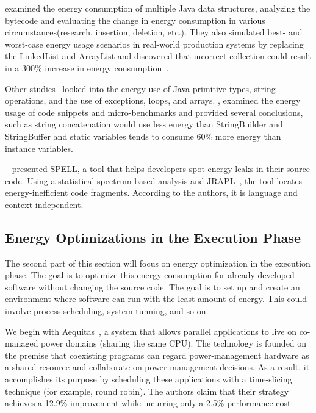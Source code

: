 \citeauthor{hasan_energy_2016} examined the energy consumption of multiple Java data structures, analyzing the bytecode and evaluating the change in energy consumption in various circumstances(research, insertion, deletion, etc.). They also simulated best- and worst-case energy usage scenarios in real-world production systems by replacing the LinkedList and ArrayList and discovered that incorrect collection could result in a 300\% increase in energy consumption~\cite{hasan_energy_2016}.

Other studies~\cite{longo_reducing_2019,kumar_energy_2017} looked into the energy use of Java primitive types, string operations, and the use of exceptions, loops, and arrays. \citeauthor{kumar_energy_2017}, examined the energy usage of code snippets and micro-benchmarks and provided several conclusions, such as string concatenation would use less energy than StringBuilder and StringBuffer and static variables tends to consume 60\% more energy than instance variables.

\citeauthor{pereira_helping_2017}~\cite{pereira_helping_2017} presented SPELL, a tool that helps developers spot energy leaks in their source code. Using a statistical spectrum-based analysis and JRAPL~\cite{guimaraes2016some,liu_data-oriented_2015}, the tool locates energy-inefficient code fragments. According to the authors, it is language and context-independent.

\subsection{Energy Optimizations in the Execution Phase}
The second part of this section will focus on energy optimization in the execution phase. The goal is to optimize this energy consumption for already developed software without changing the source code. The goal is to set up and create an environment where software can run with the least amount of energy. This could involve process scheduling, system tunning, and so on.

We begin with Aequitas~\cite{ribic2016aequitas}, a system that allows parallel applications to live on co-managed power domains (sharing the same CPU). The technology is founded on the premise that coexisting programs can regard power-management hardware as a shared resource and collaborate on power-management decisions. As a result, it accomplishes its purpose by scheduling these applications with a time-slicing technique (for example, round robin). The authors claim that their strategy achieves a 12.9\% improvement while incurring only a 2.5\% performance cost.

